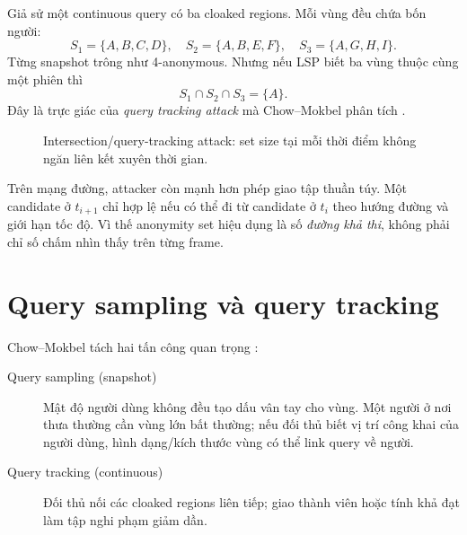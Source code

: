 \documentclass[11pt,a4paper,oneside]{report}
\newcommand{\eng}[1]{\textit{#1}}
\begin{document}
Giả sử một continuous query có ba cloaked regions. Mỗi vùng đều chứa bốn người:
\[
S_1=\{A,B,C,D\},\quad
S_2=\{A,B,E,F\},\quad
S_3=\{A,G,H,I\}.
\]
Từng snapshot trông như 4-anonymous. Nhưng nếu LSP biết ba vùng thuộc cùng một
phiên thì
\[
S_1\cap S_2\cap S_3=\{A\}.
\]
Đây là trực giác của \eng{query tracking attack} mà Chow--Mokbel phân tích
\cite{chow2007continuous}.

\begin{figure}[htbp]
\centering
{}
\caption{Intersection/query-tracking attack: set size tại mỗi thời điểm không ngăn liên kết xuyên thời gian.}
\label{fig:intersection-attack}
\end{figure}

Trên mạng đường, attacker còn mạnh hơn phép giao tập thuần túy. Một candidate ở
$t_{i+1}$ chỉ hợp lệ nếu có thể đi từ candidate ở $t_i$ theo hướng đường và giới hạn
tốc độ. Vì thế anonymity set hiệu dụng là số \emph{đường khả thi}, không phải chỉ
số chấm nhìn thấy trên từng frame.

\section{Query sampling và query tracking}

Chow--Mokbel tách hai tấn công quan trọng \cite{chow2007continuous}:

\begin{description}
  \item[Query sampling (snapshot)] Mật độ người dùng không đều tạo dấu vân tay cho
  vùng. Một người ở nơi thưa thường cần vùng lớn bất thường; nếu đối thủ biết vị
  trí công khai của người dùng, hình dạng/kích thước vùng có thể link query về người.
  \item[Query tracking (continuous)] Đối thủ nối các cloaked regions liên tiếp; giao
  thành viên hoặc tính khả đạt làm tập nghi phạm giảm dần.
\end{description}
\end{document}
